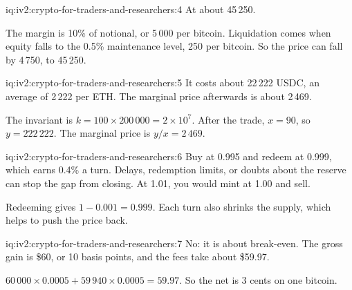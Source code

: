 \begin{solution}{iq:iv2:crypto-for-traders-and-researchers:4}
At about 45\,250.

The margin is 10\% of notional, or 5\,000 per bitcoin. Liquidation comes when equity falls to the 0.5\% maintenance level, 250 per bitcoin. So the price can fall by 4\,750, to 45\,250.

\end{solution}

\begin{solution}{iq:iv2:crypto-for-traders-and-researchers:5}
It costs about 22\,222 USDC, an average of 2\,222 per ETH. The marginal price afterwards is about 2\,469.

The invariant is $k = 100 \times 200\,000 = 2 \times 10^7$. After the trade, $x = 90$, so $y = 222\,222$. The marginal price is $y/x = 2\,469$.

\end{solution}

\begin{solution}{iq:iv2:crypto-for-traders-and-researchers:6}
Buy at 0.995 and redeem at 0.999, which earns 0.4\% a turn. Delays, redemption limits, or doubts about the reserve can stop the gap from closing. At 1.01, you would mint at 1.00 and sell.

Redeeming gives $1 - 0.001 = 0.999$. Each turn also shrinks the supply, which helps to push the price back.

\end{solution}

\begin{solution}{iq:iv2:crypto-for-traders-and-researchers:7}
No: it is about break-even. The gross gain is \$60, or 10 basis points, and the fees take about \$59.97.

$60\,000 \times 0.0005 + 59\,940 \times 0.0005 = 59.97$. So the net is 3 cents on one bitcoin.

\end{solution}

